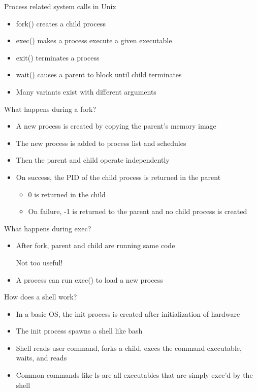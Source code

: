 \documentclass[12pt]{article}
\begin{document}
Process related system calls in Unix
\begin{itemize}
    \item fork() creates a child process
    \item exec() makes a process execute a given executable
    \item exit() terminates a process
    \item wait() causes a parent to block until child terminates
    \item Many variants exist with different arguments
\end{itemize}

What happens during a fork?
\begin{itemize}
    \item A new process is created by copying the parent's memory image
    \item The new process is added to process list and schedules
    \item Then the parent and child operate independently
    \item On success, the PID of the child process is returned in the parent
    \begin{itemize}
        \item 0 is returned in the child
        \item On failure, -1 is returned to the parent and no child process is created
    \end{itemize}
\end{itemize}

What happens during exec?
\begin{itemize}
    \item After fork, parent and child are running same code
    
    Not too useful!
    
    \item A process can run exec() to load a new process 
\end{itemize}

How does a shell work?
\begin{itemize}
    \item In a basic OS, the init process is created after initialization of hardware
    \item The init process spawns a shell like bash
    \item Shell reads user command, forks a child, execs the command executable, waits, and reads
    \item Common commands like ls are all executables that are simply exec'd by the shell
\end{itemize}
\newpage
\end{document}
